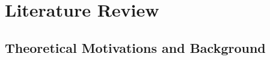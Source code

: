 \documentclass[12pt,twoside]{reedthesis}
\begin{document}


\chapter{Literature Review}
\section{Theoretical Motivations and Background}
\end{document}
